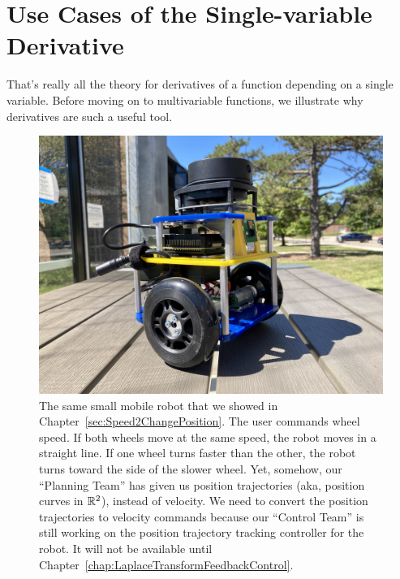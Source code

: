\Qed

\vspace*{.2cm}




\section{Use Cases of the Single-variable Derivative}

That's really all the theory for derivatives of a function depending on a single variable. Before moving on to multivariable functions, we illustrate why derivatives are such a useful tool.





\begin{figure}[htb]%
\centering
\includegraphics[width=0.6\columnwidth]{graphics/Chap03/MBotROB330.jpeg}%
    \caption[]{The same small mobile robot that we showed in Chapter~\ref{sec:Speed2ChangePosition}. The user commands wheel speed. If both wheels move at the same speed, the robot moves in a straight line. If one wheel turns faster than the other, the robot turns toward the side of the slower wheel. Yet, somehow, our ``Planning Team'' has given us position trajectories (aka, position curves in $\mathbb R^2$), instead of velocity. We need to convert the position trajectories to velocity commands because our ``Control Team'' is still working on the position trajectory tracking controller for the robot. It will not be available until Chapter~\ref{chap:LaplaceTransformFeedbackControl}.}
    \label{fig:MbotRoboticsChap05}
\end{figure}

